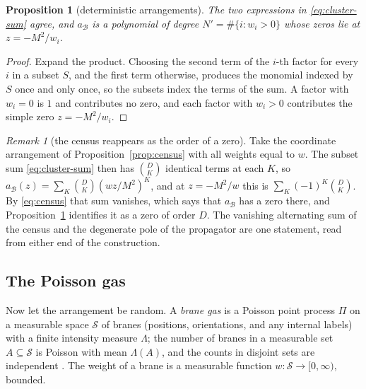 \documentclass[aps,prd,10pt,twocolumn,superscriptaddress,nofootinbib,floatfix,longbibliography,showpacs,showkeys]{revtex4-2}
\theoremstyle{plain}
\newtheorem{proposition}{Proposition}
\theoremstyle{definition}
\theoremstyle{remark}
\newtheorem{remark}{Remark}
\newcommand{\cB}{\mathcal{B}}
\begin{document}
\begin{proposition}[deterministic arrangements]
\label{prop:poly}
The two expressions in \eqref{eq:cluster-sum} agree, and $a_\cB$ is a polynomial of degree $N'=\#\{i:w_i>0\}$ whose zeros lie at $z=-M^2/w_i$.
\end{proposition}

\begin{proof}
Expand the product. Choosing the second term of the $i$-th factor for every $i$ in a subset $S$, and the first term otherwise, produces the monomial indexed by $S$ once and only once, so the subsets index the terms of the sum. A factor with $w_i=0$ is $1$ and contributes no zero, and each factor with $w_i>0$ contributes the simple zero $z=-M^2/w_i$.
\end{proof}

\begin{remark}[the census reappears as the order of a zero]
\label{rem:euler-zero}
Take the coordinate arrangement of Proposition~\ref{prop:census} with all weights equal to $w$. The subset sum \eqref{eq:cluster-sum} then has $\binom DK$ identical terms at each $K$, so $a_\cB(z)=\sum_K\binom DK(wz/M^2)^K$, and at $z=-M^2/w$ this is $\sum_K(-1)^K\binom DK$. By \eqref{eq:census} that sum vanishes, which says that $a_\cB$ has a zero there, and Proposition~\ref{prop:poly} identifies it as a zero of order $D$. The vanishing alternating sum of the census and the degenerate pole of the propagator are one statement, read from either end of the construction.
\end{remark}

\subsection{The Poisson gas}

Now let the arrangement be random. A \emph{brane gas} is a Poisson point process $\Pi$ on a measurable space $\mathcal S$ of branes (positions, orientations, and any internal labels) with a finite intensity measure $\Lambda$; the number of branes in a measurable set $A\subseteq\mathcal S$ is Poisson with mean $\Lambda(A)$, and the counts in disjoint sets are independent \cite{Kingman1993,LastPenrose2017}. The weight of a brane is a measurable function $w:\mathcal S\to[0,\infty)$, bounded.
\end{document}
